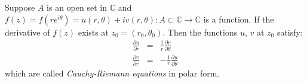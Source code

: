 \documentclass[12pt]{article}
\begin{document}
Suppose $A$ is an open set in $\mathbb{C}$ and $f(z)=f(re^{i\theta})=u(r,\theta)+iv(r,\theta): A\subset\mathbb{C} \to \mathbb{C}$ is a function.  If the derivative of $f(z)$ exists at $z_0=(r_0,\theta_0)$.  Then the functions $u$, $v$ at $z_0$ satisfy:
\begin{eqnarray*}
\frac{\partial u}{\partial r} & = & \frac{1}{r}\frac{\partial v}{\partial \theta}\\
\frac{\partial v}{\partial r} & = & -\frac{1}{r}\frac{\partial u}{\partial \theta}
\end{eqnarray*}
which are called \emph{Cauchy-Riemann equations} in polar form.\\\\
\end{document}
